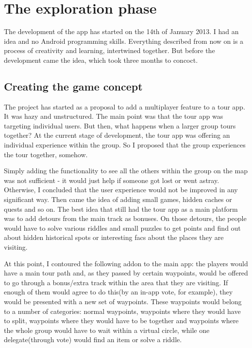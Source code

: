\documentclass{article}
\begin{document}
\section{The exploration phase}

The development of the app has started on the 14th of January 2013. I had an
idea and no Android programming skills. Everything described from now on is a
process of creativity and learning, intertwined together. But before the
development came the idea, which took three months to concoct.\newline


\subsection{Creating the game concept}

The project has started as a proposal to add a multiplayer feature to a tour
app. It was hazy and unstructured. The main point was that the tour app was
targeting individual users. But then, what happens when a larger group tours
together? At the current stage of development, the tour app was offering an
individual experience within the group. So I proposed that the group experiences
the tour together, somehow. \newline

Simply adding the functionality to see all the others within the group on the
map was not sufficient - it would just help if someone got lost or went astray.
Otherwise, I concluded that the user experience would not be improved in any
significant way. Then came the idea of adding small games, hidden caches or
quests and so on. The best idea that still had the tour app as a main platform
was to add detours from the main track as bonuses. On those detours, the people
would have to solve various riddles and small puzzles to get points and find out
about hidden historical spots or interesting facs about the places they are
visiting. \newline

At this point, I contoured the following addon to the main app: the players
would have a main tour path and, as they passed by certain waypoints, would be
offered to go through a bonus/extra track within the area that they are
visiting. If enough of them would agree to do this(by an in-app vote, for
example), they would be presented with a new set of waypoints. These waypoints
would belong to a number of categories: normal waypoints, waypoints where they
would have to split, waypoints where they would have to be together and
waypoints where the whole group would have to wait within a virtual circle,
while one delegate(through vote) would find an item or solve a riddle.\newline
\end{document}
